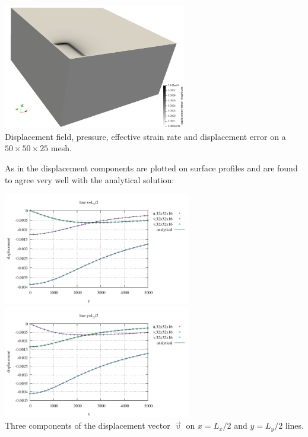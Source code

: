 \begin{center}
\includegraphics[width=8cm]{python_codes/fieldstone_123/results/exp1/error} \\
{\captionfont Displacement field, pressure, effective strain rate and 
displacement error on a $50\times 50\times 25$ mesh.}
\end{center} 

As in \textcite{bebe04} the displacement components are plotted on surface profiles
and are found to agree very well with the analytical solution:

\begin{center}
\includegraphics[width=8.2cm]{python_codes/fieldstone_123/results/exp1/xprofile.pdf} 
\includegraphics[width=8.2cm]{python_codes/fieldstone_123/results/exp1/yprofile.pdf} \\
{\captionfont Three components of the displacement vector $\vec{\upupsilon}$
on $x=L_x/2$ and $y=L_y/2$ lines.}
\end{center}


